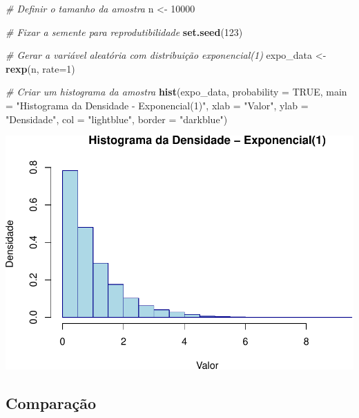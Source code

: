 \documentclass[
]{book}
\newenvironment{Shaded}{\begin{snugshade}}{\end{snugshade}}
\newcommand{\AttributeTok}[1]{\textcolor[rgb]{0.13,0.29,0.53}{#1}}
\newcommand{\CommentTok}[1]{\textcolor[rgb]{0.56,0.35,0.01}{\textit{#1}}}
\newcommand{\ConstantTok}[1]{\textcolor[rgb]{0.56,0.35,0.01}{#1}}
\newcommand{\DecValTok}[1]{\textcolor[rgb]{0.00,0.00,0.81}{#1}}
\newcommand{\FunctionTok}[1]{\textcolor[rgb]{0.13,0.29,0.53}{\textbf{#1}}}
\newcommand{\NormalTok}[1]{#1}
\newcommand{\OtherTok}[1]{\textcolor[rgb]{0.56,0.35,0.01}{#1}}
\newcommand{\StringTok}[1]{\textcolor[rgb]{0.31,0.60,0.02}{#1}}
\begin{document}
\begin{Shaded}
\begin{Highlighting}[]
\CommentTok{\# Definir o tamanho da amostra}
\NormalTok{n }\OtherTok{\textless{}{-}} \DecValTok{10000}

\CommentTok{\# Fixar a semente para reprodutibilidade}
\FunctionTok{set.seed}\NormalTok{(}\DecValTok{123}\NormalTok{)}

\CommentTok{\# Gerar a variável aleatória com distribuição exponencial(1)}
\NormalTok{expo\_data }\OtherTok{\textless{}{-}} \FunctionTok{rexp}\NormalTok{(n, }\AttributeTok{rate=}\DecValTok{1}\NormalTok{)}

\CommentTok{\# Criar um histograma da amostra }
\FunctionTok{hist}\NormalTok{(expo\_data, }\AttributeTok{probability =} \ConstantTok{TRUE}\NormalTok{, }
     \AttributeTok{main =} \StringTok{"Histograma da Densidade {-} Exponencial(1)"}\NormalTok{, }
     \AttributeTok{xlab =} \StringTok{"Valor"}\NormalTok{, }
     \AttributeTok{ylab =} \StringTok{"Densidade"}\NormalTok{, }
     \AttributeTok{col =} \StringTok{"lightblue"}\NormalTok{, }
     \AttributeTok{border =} \StringTok{"darkblue"}\NormalTok{)}
\end{Highlighting}
\end{Shaded}

\includegraphics{introR_files/figure-latex/unnamed-chunk-275-1.pdf}

\subsection{Comparação}\label{comparauxe7uxe3o-3}
\end{document}
